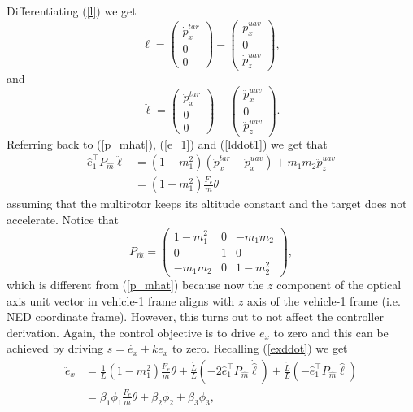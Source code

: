 Differentiating (\ref{l}) we get
\begin{equation}
\dot{\ell}=\begin{pmatrix}
\dot{p}_x^{tar} \\ 0 \\ 0
\end{pmatrix}
-\begin{pmatrix}
\dot{p}_x^{uav} \\ 0 \\ \dot{p}_z^{uav}
\end{pmatrix},
\label{ldot}
\end{equation}
and 
\begin{equation}
\ddot{\ell}=\begin{pmatrix}
\ddot{p}_x^{tar} \\ 0 \\ 0
\end{pmatrix}
-\begin{pmatrix}
\ddot{p}_x^{uav} \\ 0 \\ \ddot{p}_z^{uav}
\end{pmatrix}.
\label{lddot1}
\end{equation}
Referring back to (\ref{p_mhat}), (\ref{e_1}) and (\ref{lddot1}) we get that  
\begin{align}
\hat{e}_1^{\top}P_{\hat{m}}\ddot{\ell}&=(1-m_1^2)(\ddot{p}_x^{tar}-\ddot{p}_x^{uav})+m_1m_2\ddot{p}_z^{uav}
\\&=(1-m_1^2)\frac{F_e}{m}\theta
\end{align}
assuming that the multirotor keeps its altitude constant and the target does not accelerate. Notice that 
\begin{equation}
P_{\hat{m}}=\begin{pmatrix}1-m_1^2 & 0 & -m_1m_2 \\ 0 & 1 & 0 \\ -m_1m_2 & 0 & 1-m_2^2 \end{pmatrix},
\end{equation}
which is different from (\ref{p_mhat}) because now the $z$ component of the optical axis unit vector in vehicle-1 frame aligns with $z$ axis of the vehicle-1 frame (i.e. NED coordinate frame). However, this turns out to not affect the controller derivation.  Again, the control objective is to drive $e_x$ to zero and this can be achieved by driving $s=\dot{e_x}+ke_x$ to zero.
Recalling (\ref{exddot}) we get
\begin{align}
\ddot{e}_x&=\frac{1}{L}(1-m_1^2)\frac{F_e}{m}\theta+\frac{\dot{L}}{L}(-2\hat{e}_1^{\top}P_{\hat{m}}\dot{\hat{\ell}})+\frac{\ddot{L}}{L}(-\hat{e}_1^{\top}P_{\hat{m}}\hat{\ell})
\\&=\beta_1\phi_1\frac{F_e}{m}\theta+\beta_2\phi_2+\beta_3\phi_3,
\label{exddot1}
\end{align} 
